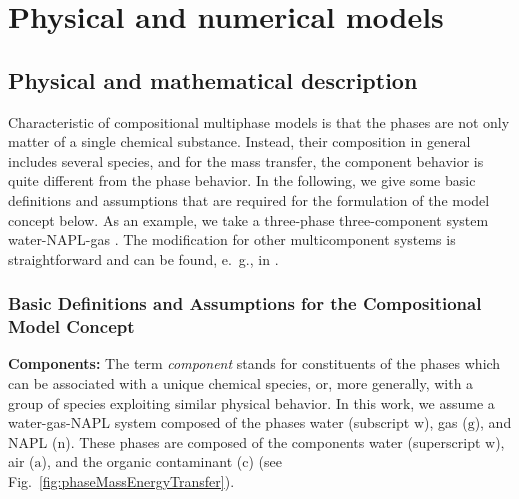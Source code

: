 \chapter[Models]{Physical and numerical models}

\section{Physical and mathematical description} 

Characteristic of compositional multiphase models is that the phases
are not only matter of a single chemical substance. Instead, their
composition in general includes several species, and for the mass transfer, 
the component behavior is quite different from the phase behavior. In the following, we
give some basic definitions and assumptions that are required for the
formulation of the model concept below. As an example, we take a
three-phase three-component system water-NAPL-gas
\cite{A3:class:2002a}. The modification for other multicomponent
systems is straightforward and can be found, e.\ g., in
\cite{A3:bielinski:2006,A3:acosta:2006}.

\subsection{Basic Definitions and Assumptions for the Compositional
  Model Concept}
\textbf{Components:}
The term {\it component} stands for constituents of the phases which
can be associated with a unique chemical species, or, more generally, with 
a group of species exploiting similar physical behavior. In this work, we
assume a water-gas-NAPL system composed of the phases water (subscript
$\text{w}$), gas ($\text{g}$), and NAPL ($\text{n}$). These phases are
composed of the components water (superscript $\text{w}$), air
($\text{a}$), and the organic contaminant ($\text{c}$) (see Fig.\
\ref{fig:phaseMassEnergyTransfer}).

